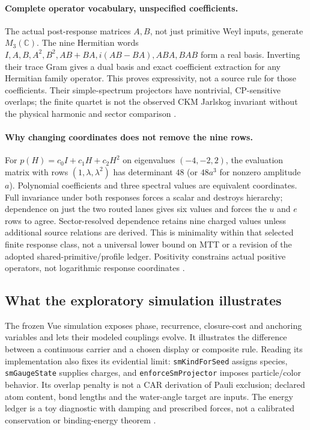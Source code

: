 \documentclass[11pt]{article}
\begin{document}
\paragraph{Complete operator vocabulary, unspecified coefficients.}
\label{sec:fsb04f}
The actual post-response matrices $A,B$, not just primitive Weyl inputs,
generate $M_3(\mathbb C)$. The nine Hermitian words
$I,A,B,A^2,B^2,AB+BA,i(AB-BA),ABA,BAB$ form a real basis. Inverting their
trace Gram gives a dual basis and exact coefficient extraction for any
Hermitian family operator. This proves expressivity, not a source rule for
those coefficients. Their simple-spectrum projectors have nontrivial,
CP-sensitive overlaps; the finite quartet is not the observed CKM Jarlskog
invariant without the physical harmonic and sector comparison \cite{FSB04f}.

\paragraph{Why changing coordinates does not remove the nine rows.}
\label{sec:fsb04g}
For $p(H)=c_0I+c_1H+c_2H^2$ on eigenvalues $(-4,-2,2)$, the evaluation
matrix with rows $(1,\lambda,\lambda^2)$ has determinant $48$ (or
$48a^3$ for nonzero amplitude $a$). Polynomial coefficients and three
spectral values are equivalent coordinates. Full invariance under both
responses forces a scalar and destroys hierarchy; dependence on just the
two routed lanes gives six values and forces the $u$ and $e$ rows to agree.
Sector-resolved dependence retains nine charged values unless additional
source relations are derived. This is minimality within that selected
finite response class, not a universal lower bound on MTT or a revision of
the adopted shared-primitive/profile ledger. Positivity constrains actual
positive operators, not logarithmic response coordinates \cite{FSB04g}.

\subsection{What the exploratory simulation illustrates}
\label{sec:simulation}
The frozen Vue simulation exposes phase, recurrence, closure-cost and
anchoring variables and lets their modeled couplings evolve. It illustrates
the difference between a continuous carrier and a chosen display or composite
rule. Reading its implementation also fixes its evidential limit:
\texttt{smKindForSeed} assigns species, \texttt{smGaugeState} supplies
charges, and \texttt{enforceSmProjector} imposes particle/color behavior.
Its overlap penalty is not a CAR derivation of Pauli exclusion; declared atom
content, bond lengths and the water-angle target are inputs. The energy
ledger is a toy diagnostic with damping and prescribed forces, not a
calibrated conservation or binding-energy theorem \cite{ProtoSim}.
\end{document}
